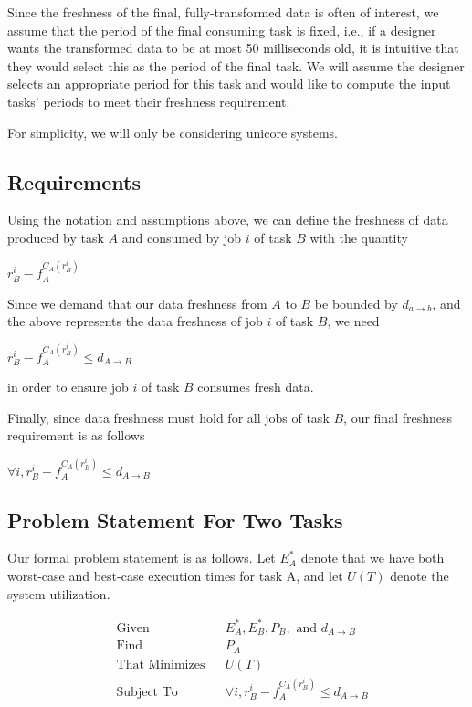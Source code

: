 Since the freshness of the final, fully-transformed data is often of interest, we assume that the period of the final consuming task is fixed, i.e., if a designer wants the transformed data to be at most 50 milliseconds old, it is intuitive that they would select this as the period of the final task. We will assume the designer selects an appropriate period for this task and would like to compute the input tasks' periods to meet their freshness requirement.

For simplicity, we will only be considering unicore systems.

\subsection{Requirements}

Using the notation and assumptions above, we can define the freshness of data produced by task $A$ and consumed by job $i$ of task $B$ with the quantity
\begin{center}
	$r^i_B - f_A^{C_A(r^i_B)}$
\end{center}

Since we demand that our data freshness from $A$ to $B$ be bounded by $d_{a \to b}$, and the above represents the data freshness of job $i$ of task $B$, we need
\begin{center}
	$r^i_B - f_A^{C_A(r^i_B)} \leq d_{A \to B}$
\end{center}
in order to ensure job $i$ of task $B$ consumes fresh data.

Finally, since data freshness must hold for all jobs of task $B$, our final freshness requirement is as follows
\begin{center}
	$\forall i, r^i_B - f_A^{C_A(r^i_B)} \leq d_{A \to B}$
\end{center}

\subsection{Problem Statement For Two Tasks}

Our formal problem statement is as follows. Let $E^*_A$ denote that we have both worst-case and best-case execution times for task A, and let $U(T)$ denote the system utilization.

\begin{equation*}
	\begin{aligned}
		& \text{Given}
		& & E^*_A, E^*_B, P_B, \text{ and } d_{A \to B} \\
		& \text{Find}
		& & P_A \\
		& \text{That Minimizes}
		& & U(T) \\
		& \text{Subject To}
		& & \forall i, r^i_B - f_A^{C_A(r^i_B)} \leq d_{A \to B}
	\end{aligned}
\end{equation*}

